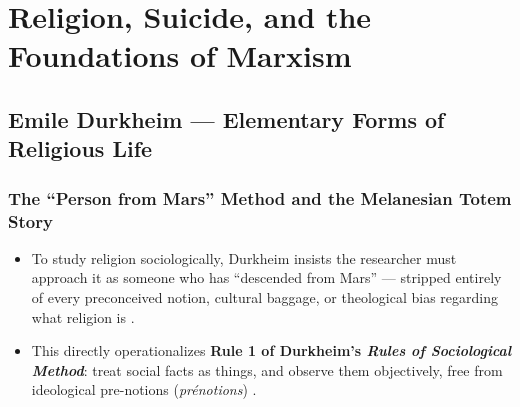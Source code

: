 
\chapter{Religion, Suicide, and the Foundations of Marxism}

\section{Emile Durkheim --- Elementary Forms of Religious Life}

\subsection{The ``Person from Mars'' Method and the Melanesian Totem Story}

\begin{KeyConcept}
\begin{itemize}
    \item To study religion sociologically, Durkheim insists the researcher must approach it as someone who has ``descended from Mars'' --- stripped entirely of every preconceived notion, cultural baggage, or theological bias regarding what religion is .
    \item This directly operationalizes \textbf{Rule 1 of Durkheim's \textit{Rules of Sociological Method}}: treat social facts as things, and observe them objectively, free from ideological pre-notions (\textit{prénotions}) .
\end{itemize}
\end{KeyConcept}

